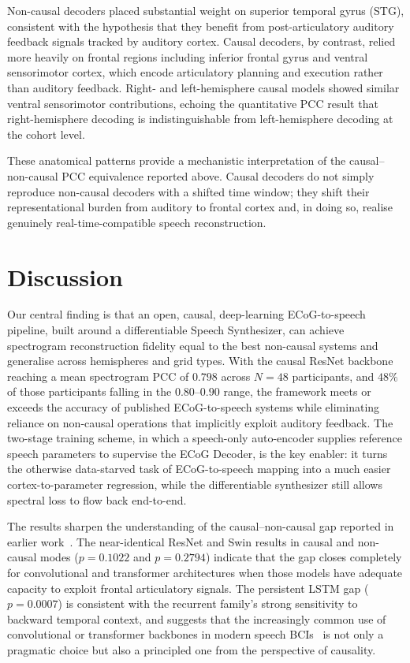 \documentclass[11pt]{article}
\begin{document}
Non-causal decoders placed substantial weight on superior temporal gyrus
(STG), consistent with the hypothesis that they benefit from
post-articulatory auditory feedback signals tracked by auditory cortex.
Causal decoders, by contrast, relied more heavily on frontal regions
including inferior frontal gyrus and ventral sensorimotor cortex, which
encode articulatory planning and execution rather than auditory feedback.
Right- and left-hemisphere causal models showed similar ventral
sensorimotor contributions, echoing the quantitative PCC result that
right-hemisphere decoding is indistinguishable from left-hemisphere
decoding at the cohort level.

These anatomical patterns provide a mechanistic interpretation of the
causal--non-causal PCC equivalence reported above. Causal decoders do
not simply reproduce non-causal decoders with a shifted time window;
they shift their representational burden from auditory to frontal cortex
and, in doing so, realise genuinely real-time-compatible speech
reconstruction.

\section{Discussion}

Our central finding is that an open, causal, deep-learning ECoG-to-speech
pipeline, built around a differentiable Speech Synthesizer, can achieve
spectrogram reconstruction fidelity equal to the best non-causal systems
and generalise across hemispheres and grid types. With the causal ResNet
backbone reaching a mean spectrogram PCC of $0.798$ across $N=48$
participants, and $48\%$ of those participants falling in the $0.80$--$0.90$
range, the framework meets or exceeds the accuracy of published
ECoG-to-speech systems while eliminating reliance on non-causal operations
that implicitly exploit auditory feedback. The two-stage training scheme,
in which a speech-only auto-encoder supplies reference speech parameters
to supervise the ECoG Decoder, is the key enabler: it turns the
otherwise data-starved task of ECoG-to-speech mapping into a much easier
cortex-to-parameter regression, while the differentiable synthesizer
still allows spectral loss to flow back end-to-end.

The results sharpen the understanding of the causal--non-causal gap
reported in earlier work~\cite{anumanchipalli2019speech,akbari2019towards,moses2021neuroprosthesis,metzger2023highperformance,silva2024bilingual}.
The near-identical ResNet and Swin results in causal and non-causal modes
($p=0.1022$ and $p=0.2794$) indicate that the gap closes completely for
convolutional and transformer architectures when those models have
adequate capacity to exploit frontal articulatory signals. The persistent
LSTM gap ($p=0.0007$) is consistent with the recurrent family's strong
sensitivity to backward temporal context, and suggests that the
increasingly common use of convolutional or transformer backbones in
modern speech BCIs~\cite{willett2023highperformance,metzger2023highperformance}
is not only a pragmatic choice but also a principled one from the
perspective of causality.
\end{document}
